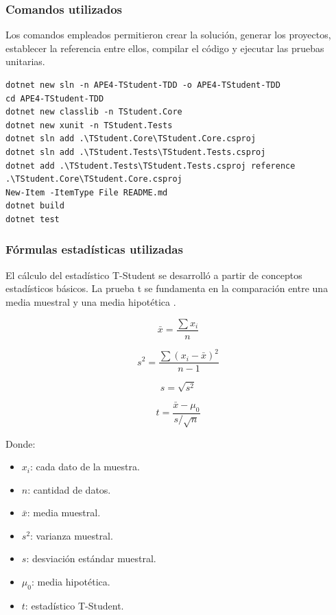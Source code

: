 \documentclass[12pt]{article}
\begin{document}
\subsubsection{Comandos utilizados}

Los comandos empleados permitieron crear la solución, generar los proyectos, establecer la referencia entre ellos, compilar el código y ejecutar las pruebas unitarias.

\begin{lstlisting}[caption={Comandos utilizados durante la práctica}]
dotnet new sln -n APE4-TStudent-TDD -o APE4-TStudent-TDD
cd APE4-TStudent-TDD
dotnet new classlib -n TStudent.Core
dotnet new xunit -n TStudent.Tests
dotnet sln add .\TStudent.Core\TStudent.Core.csproj
dotnet sln add .\TStudent.Tests\TStudent.Tests.csproj
dotnet add .\TStudent.Tests\TStudent.Tests.csproj reference .\TStudent.Core\TStudent.Core.csproj
New-Item -ItemType File README.md
dotnet build
dotnet test
\end{lstlisting}

\subsubsection{Fórmulas estadísticas utilizadas}

El cálculo del estadístico T-Student se desarrolló a partir de conceptos estadísticos básicos. La prueba t se fundamenta en la comparación entre una media muestral y una media hipotética \cite{student1908probable}.

\begin{equation}
\bar{x} = \frac{\sum x_i}{n}
\end{equation}

\begin{equation}
s^2 = \frac{\sum (x_i - \bar{x})^2}{n - 1}
\end{equation}

\begin{equation}
s = \sqrt{s^2}
\end{equation}

\begin{equation}
t = \frac{\bar{x} - \mu_0}{s / \sqrt{n}}
\end{equation}

Donde:

\begin{itemize}
    \item $x_i$: cada dato de la muestra.
    \item $n$: cantidad de datos.
    \item $\bar{x}$: media muestral.
    \item $s^2$: varianza muestral.
    \item $s$: desviación estándar muestral.
    \item $\mu_0$: media hipotética.
    \item $t$: estadístico T-Student.
\end{itemize}
\end{document}
